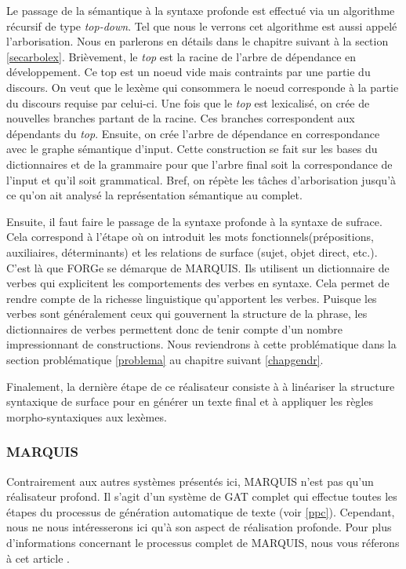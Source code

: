 Le passage de la sémantique à la syntaxe profonde est effectué via un algorithme récursif de type \emph{top-down}. Tel que nous le verrons cet algorithme est aussi appelé l'arborisation. Nous en parlerons en détails dans le chapitre suivant à la section \ref{secarbolex}. Brièvement, le \emph{top} est la racine de l'arbre de dépendance en développement. Ce top est un noeud vide mais contraints par une partie du discours. On veut que le lexème qui consommera le noeud corresponde à la partie du discours requise par celui-ci. Une fois que le \emph{top} est lexicalisé, on crée de nouvelles branches partant de la racine. Ces branches correspondent aux dépendants du \emph{top}. Ensuite, on crée l'arbre de dépendance en correspondance avec le graphe sémantique d'input. Cette construction se fait sur les bases du dictionnaires et de la grammaire pour que l'arbre final soit la correspondance de l'input et qu'il soit grammatical. Bref, on répète les tâches d'arborisation jusqu'à ce qu'on ait analysé la représentation sémantique au complet.

Ensuite, il faut faire le passage de la syntaxe profonde à la syntaxe de sufrace. Cela correspond à l'étape où on introduit les mots fonctionnels(prépositions, auxiliaires, déterminants) et les relations de surface (sujet, objet direct, etc.). C'est là que FORGe se démarque de MARQUIS. Ils utilisent un dictionnaire de verbes qui explicitent les comportements des verbes en syntaxe. Cela permet de rendre compte de la richesse linguistique qu'apportent les verbes. Puisque les verbes sont généralement ceux qui gouvernent la structure de la phrase, les dictionnaires de verbes permettent donc de tenir compte d'un nombre impressionnant de constructions. Nous reviendrons à cette problématique dans la section problématique \ref{problema} au chapitre suivant \ref{chapgendr}.

Finalement, la dernière étape de ce réalisateur consiste à à linéariser la structure syntaxique de surface pour en générer un texte final et à appliquer les règles morpho-syntaxiques aux lexèmes.

\subsubsection{MARQUIS}\label{sectionmarquis}
Contrairement aux autres systèmes présentés ici, MARQUIS n'est pas qu'un réalisateur profond. Il s'agit d'un système de \ac{GAT} complet qui effectue toutes les étapes du processus de génération automatique de texte (voir \ref{ppc}). Cependant, nous ne nous intéresserons ici qu'à son aspect de réalisation profonde. Pour plus d'informations concernant le processus complet de MARQUIS, nous vous réferons à cet article \citep{WannerMARQUISGENERATIONUSERTAILORED2010}. 


